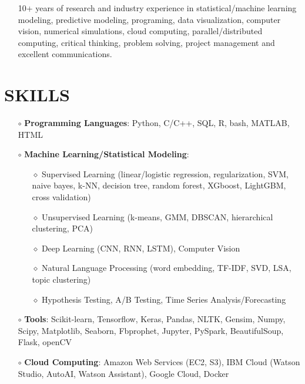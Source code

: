 \documentclass[10pt]{res}
\newcommand{\blockline}{\noindent\hspace{-0.03\textwidth}
{\rule{1.03\textwidth}{0.8pt}}}
\newcommand{\blocklinethin}{\noindent\hspace{-0.03\textwidth}
{\rule{1.03\textwidth}{0.3pt}}}
\begin{document}
\begin{resume}

\vspace{-0.3cm}

\noindent{\blocklinethin}
\begin{itemize}[leftmargin=-0.4cm]
\item[] 10+ years of research and industry experience in statistical/machine learning modeling, predictive modeling, programing, data visualization, computer vision, numerical simulations, cloud computing, parallel/distributed computing,  critical thinking, problem solving, project management and excellent communications.

\end{itemize}

\vspace{-0.3cm}
  
\section{\large SKILLS}
\vspace{-0.2cm}
\noindent{\blockline}
\begin{itemize}[leftmargin=0.0cm]
\item[$\circ$]{\textbf{Programming Languages}: Python,  C/C++, SQL, R, bash, MATLAB, HTML}

\item[$\circ$]{\textbf{Machine Learning/Statistical Modeling}}: 

 \begin{itemize}[leftmargin=0.35cm]
\item[$\diamond$] Supervised Learning (linear/logistic regression, regularization, SVM, naive bayes, k-NN, decision tree, random forest, XGboost, LightGBM, cross validation)
\item[$\diamond$] Unsupervised Learning (k-means, GMM, DBSCAN, hierarchical clustering, PCA)
\item[$\diamond$] Deep Learning (CNN, RNN, LSTM), Computer Vision
\item[$\diamond$] Natural Language Processing (word embedding, TF-IDF, SVD, LSA, topic clustering)
\item[$\diamond$] Hypothesis Testing, A/B Testing, Time Series Analysis/Forecasting
 \end{itemize}

\item[$\circ$]{\textbf{Tools}: Scikit-learn, Tensorflow, Keras, Pandas, NLTK, Gensim, Numpy, Scipy, Matplotlib, Seaborn, Fbprophet, Jupyter, PySpark, BeautifulSoup, Flask,  openCV}
\item[$\circ$]{\textbf{Cloud Computing}: Amazon Web Services (EC2, S3), IBM Cloud (Watson Studio, AutoAI, Watson Assistant), Google Cloud, Docker}


\end{itemize}
\end{resume}
\end{document}
